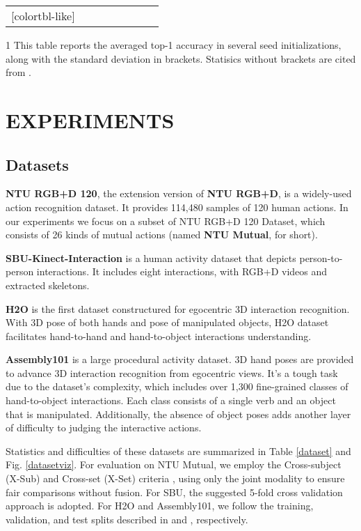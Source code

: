 \documentclass[letterpaper, 10 pt, conference]{ieeeconf}
\begin{document}
\begin{table*}[t]
{\begin{threeparttable}
{\begin{NiceTabular}{c|l|c|c|C{22mm}|C{22mm}|c|c}[colortbl-like]
		\hline
	\end{NiceTabular}
        }
        \begin{tablenotes}
         \item[1] This table reports the averaged top-1 accuracy in several seed initializations, along with the standard deviation in brackets. Statisics without brackets are cited from \cite{igformer2022, H2O_TA-GCN2021, Assembly101}.
       \end{tablenotes}
       \end{threeparttable}
        }
        \vspace{-1.0em}
\end{table*}

\section{EXPERIMENTS}
\subsection{Datasets}

\textbf{NTU RGB+D 120}\cite{NTU120}, the extension version of \textbf{NTU RGB+D}\cite{NTU60}, is a widely-used action recognition dataset. It provides 114,480 samples of 120 human actions. In our experiments we focus on a subset of NTU RGB+D 120 Dataset, which consists of 26 kinds of mutual actions (named \textbf{NTU Mutual}, for short). 

\textbf{SBU-Kinect-Interaction}\cite{SBU} is a human activity
dataset that depicts person-to-person interactions. It includes eight interactions, with RGB+D videos and extracted skeletons.

\textbf{H2O}\cite{H2O_TA-GCN2021} is the first dataset constructured for egocentric 3D interaction recognition. With 3D pose of both hands and pose of manipulated objects, H2O dataset facilitates hand-to-hand and hand-to-object interactions understanding.

\textbf{Assembly101}\cite{Assembly101} is a large procedural activity dataset. 3D hand poses are provided to advance 3D interaction recognition from egocentric views. It's a tough task due to the dataset's complexity, which includes over 1,300 fine-grained classes of hand-to-object interactions. Each class consists of a single verb and an object that is manipulated. Additionally, the absence of object poses adds another layer of difficulty to judging the interactive actions.

Statistics and difficulties of these datasets are summarized in Table \ref{dataset} and Fig. \ref{datasetviz}. For evaluation on NTU Mutual, we employ the Cross-subject (X-Sub) and Cross-set (X-Set) criteria \cite{NTU120}, using only the joint modality to ensure fair comparisons without fusion. For SBU, the suggested 5-fold cross validation approach \cite{SBU} is adopted. For H2O and Assembly101, we follow the training, validation, and test splits described in \cite{H2O_TA-GCN2021} and \cite{Assembly101}, respectively.
\end{document}
